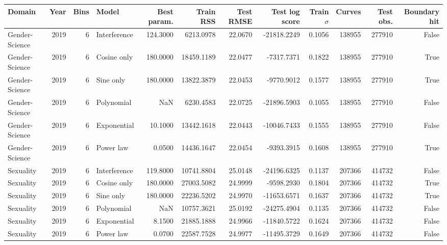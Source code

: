 \begin{tabular}{lrrlrrrrrrrr}
\toprule
Domain & Year & Bins & Model & Best param. & Train RSS & Test RMSE & Test log score & Train $\sigma$ & Curves & Test obs. & Boundary hit \\
\midrule
Gender-Science & 2019 & 6 & Interference & 124.3000 & 6213.0978 & 22.0670 & -21818.2249 & 0.1056 & 138955 & 277910 & False \\
Gender-Science & 2019 & 6 & Cosine only & 180.0000 & 18459.1189 & 22.0477 & -7317.7371 & 0.1822 & 138955 & 277910 & True \\
Gender-Science & 2019 & 6 & Sine only & 180.0000 & 13822.3879 & 22.0453 & -9770.9012 & 0.1577 & 138955 & 277910 & True \\
Gender-Science & 2019 & 6 & Polynomial & NaN & 6230.4583 & 22.0725 & -21896.5903 & 0.1055 & 138955 & 277910 & False \\
Gender-Science & 2019 & 6 & Exponential & 10.1000 & 13442.1618 & 22.0443 & -10046.7433 & 0.1555 & 138955 & 277910 & False \\
Gender-Science & 2019 & 6 & Power law & 0.0500 & 14436.1647 & 22.0454 & -9393.3915 & 0.1608 & 138955 & 277910 & True \\
Sexuality & 2019 & 6 & Interference & 119.8000 & 10741.8804 & 25.0148 & -24196.6325 & 0.1137 & 207366 & 414732 & False \\
Sexuality & 2019 & 6 & Cosine only & 180.0000 & 27003.5082 & 24.9999 & -9598.2930 & 0.1804 & 207366 & 414732 & True \\
Sexuality & 2019 & 6 & Sine only & 180.0000 & 22236.5202 & 24.9970 & -11653.6571 & 0.1637 & 207366 & 414732 & True \\
Sexuality & 2019 & 6 & Polynomial & NaN & 10757.3621 & 25.0192 & -24275.4904 & 0.1135 & 207366 & 414732 & False \\
Sexuality & 2019 & 6 & Exponential & 8.1500 & 21885.1888 & 24.9966 & -11840.5722 & 0.1624 & 207366 & 414732 & False \\
Sexuality & 2019 & 6 & Power law & 0.0700 & 22587.7528 & 24.9977 & -11495.3729 & 0.1649 & 207366 & 414732 & False \\
\bottomrule
\end{tabular}
